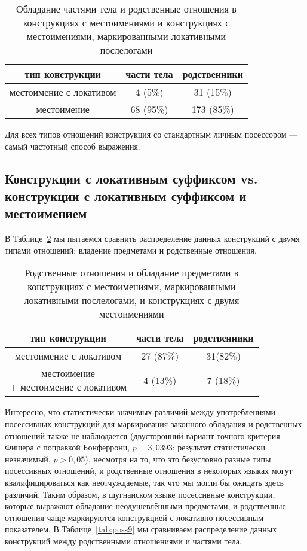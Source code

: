 \begin{table}[h]
 \centering
 \caption{Обладание частями тела и родственные отношения в конструкциях с местоимениями и конструкциях с местоимениями, маркированными локативными послелогами}
 \smallskip
 \label{tab:poss7}
 \begin{tabular}{c|cc} \toprule
 тип конструкции & части тела & родственники \\ \midrule
 местоимение с локативом & 4 (5\%) & 31 (15\%) \\
 местоимение & 68 (95\%) & 173 (85\%) \\ \bottomrule
 \end{tabular}
\end{table}

Для всех типов отношений конструкция со стандартным личным посессором — самый частотный способ выражения.

\subsection{Конструкции с локативным суффиксом vs. конструкции с локативным суффиксом и местоимением}

В Таблице~\ref{tab:poss8} мы пытаемся сравнить распределение данных конструкций с двумя типами отношений: владение предметами и родственные отношения.

\begin{table}[h]
 \centering
 \caption{Родственные отношения и обладание предметами в конструкциях с местоимениями, маркированными локативными послелогами, и конструкциях с двумя местоимениями}
 \smallskip
 \label{tab:poss8}
 \begin{tabular}{c|cc} \toprule
 тип конструкции & части тела & родственники \\ \midrule
 местоимение с локативом & 27 (87\%) & 31(82\%) \\
 \makecell{местоимение\\+ местоимение с локативом} & 4 (13\%) & 7 (18\%) \\ \bottomrule
 \end{tabular}
\end{table}

Интересно, что статистически значимых различий между употреблениями посессивных конструкций для маркирования законного обладания и родственных отношений также не наблюдается (двусторонний вариант точного критерия Фишера с поправкой Бонферрони, $p = 3,0393$; результат статистически незначимый, $p > 0,05$), несмотря на то, что это безусловно разные типы посессивных отношений, и родственные отношения в некоторых языках могут квалифицироваться как неотчуждаемые, так что мы могли бы ожидать здесь различий. Таким образом, в шугнанском языке посессивные конструкции, которые выражают обладание неодушевлёнными предметами, и родственные отношения чаще маркируются конструкцией с локативно-посессивным показателем. В Таблице~\ref{tab:poss9} мы сравниваем распределение данных конструкций между родственными отношениями и частями тела.

